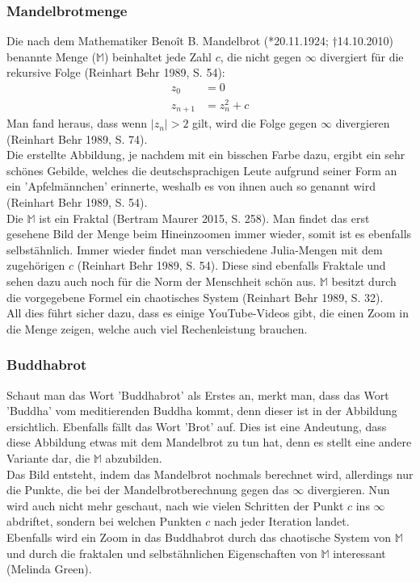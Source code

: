 \subsubsection{Mandelbrotmenge}
Die nach dem Mathematiker Benoît B. Mandelbrot (*20.11.1924; †14.10.2010) benannte Menge ($\mathbb{M}$) beinhaltet jede Zahl $c$, die nicht gegen $\infty$ divergiert für die rekursive Folge (Reinhart Behr 1989, S. 54):
\begin{align*}
z_0&=0\\
z_{n+1}&=z^2_n+c
\end{align*}
Man fand heraus, dass wenn $|z_n| > 2$ gilt, wird die Folge gegen $\infty$ divergieren (Reinhart Behr 1989, S. 74).\\
Die erstellte Abbildung, je nachdem mit ein bisschen Farbe dazu, ergibt ein sehr schönes Gebilde, welches die deutschsprachigen Leute aufgrund seiner Form an ein 'Apfelmännchen' erinnerte, weshalb es von ihnen auch so genannt wird (Reinhart Behr 1989, S. 54).\\
Die $\mathbb{M}$ ist ein Fraktal (Bertram Maurer 2015, S. 258). Man findet das erst gesehene Bild der Menge beim Hineinzoomen immer wieder, somit ist es ebenfalls selbstähnlich. Immer wieder findet man verschiedene Julia-Mengen mit dem zugehörigen $c$ (Reinhart Behr 1989, S. 54). Diese sind ebenfalls Fraktale und sehen dazu auch noch für die Norm der Menschheit schön aus. $\mathbb{M}$ besitzt durch die vorgegebene Formel ein chaotisches System (Reinhart Behr 1989, S. 32).\\
All dies führt sicher dazu, dass es einige YouTube-Videos gibt, die einen Zoom in die Menge zeigen, welche auch viel Rechenleistung brauchen.

\subsubsection{Buddhabrot}
Schaut man das Wort 'Buddhabrot' als Erstes an, merkt man, dass das Wort 'Buddha' vom meditierenden Buddha kommt, denn dieser ist in der Abbildung ersichtlich. Ebenfalls fällt das Wort 'Brot' auf. Dies ist eine Andeutung, dass diese Abbildung etwas mit dem Mandelbrot zu tun hat, denn es stellt eine andere Variante dar, die $\mathbb{M}$ abzubilden.\\ 
Das Bild entsteht, indem das Mandelbrot nochmals berechnet wird, allerdings nur die Punkte, die bei der Mandelbrotberechnung gegen das $\infty$ divergieren. Nun wird auch nicht mehr geschaut, nach wie vielen Schritten der Punkt $c$ ins $\infty$ abdriftet, sondern bei welchen Punkten $c$ nach jeder Iteration landet.\\
Ebenfalls wird ein Zoom in das Buddhabrot durch das chaotische System von $\mathbb{M}$ und durch die fraktalen und selbstähnlichen Eigenschaften von $\mathbb{M}$ interessant (Melinda Green).